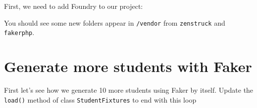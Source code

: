 \documentclass[a4paperpaper,openright]{book}
\newenvironment{Shaded}{}{}
\newcommand{\ExtensionTok}[1]{#1}
\newcommand{\NormalTok}[1]{#1}
\begin{document}
First, we need to add Foundry to our project:

\begin{Shaded}
\end{Shaded}

You should see some new folders appear in \texttt{/vendor} from
\texttt{zenstruck} and \texttt{fakerphp}.

\hypertarget{generate-more-students-with-faker}{%
\section{Generate more students with
Faker}\label{generate-more-students-with-faker}}

First let's see how we generate 10 more students using Faker by itself.
Update the \texttt{load()} method of class \texttt{StudentFixtures} to
end with this loop
\end{document}
